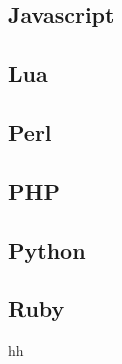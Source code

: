 \documentclass{KodeBook}
\begin{document}

\subsection{Javascript} 


\subsection{Lua}


\subsection{Perl}


\subsection{PHP}


\subsection{Python}


\subsection{Ruby}

hh




\ifx\wholebook\relax\else
% 
% 
	
\end{document}
